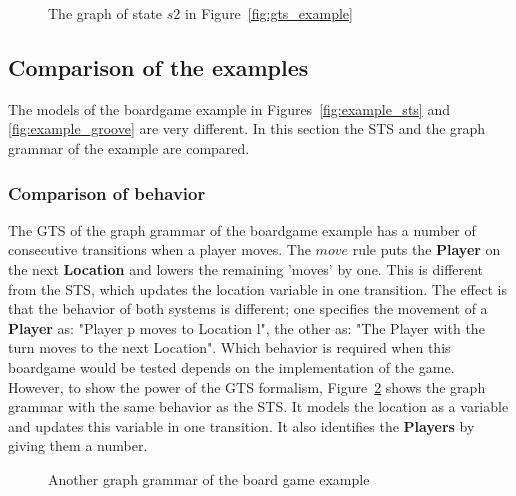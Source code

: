 \begin{figure}[ht]
  \begin{center}
    
  \end{center}
  \caption{The graph of state $s2$ in Figure~\ref{fig:gts_example}}
  \label{fig:target_graph_state}
\end{figure}

\subsection{Comparison of the examples}\label{sec:comparison}
The models of the boardgame example in Figures~\ref{fig:example_sts} and \ref{fig:example_groove} are very different. In this section the STS and the graph grammar of the example are compared.

\subsubsection{Comparison of behavior}
The GTS of the graph grammar of the boardgame example has a number of consecutive transitions when a player moves. The $move$ rule puts the \textbf{Player} on the next \textbf{Location} and lowers the remaining 'moves' by one. This is different from the STS, which updates the location variable in one transition. The effect is that the behavior of both systems is different; one specifies the movement of a \textbf{Player} as: "Player p moves to Location l", the other as: "The Player with the turn moves to the next Location". Which behavior is required when this boardgame would be tested depends on the implementation of the game. However, to show the power of the GTS formalism, Figure~\ref{fig:example_groove2} shows the graph grammar with the same behavior as the STS. It models the location as a variable and updates this variable in one transition. It also identifies the \textbf{Players} by giving them a number.

\begin{figure}[ht]
  \begin{center}
    \quad
  \end{center}
  \caption{Another graph grammar of the board game example}
  \label{fig:example_groove2}
\end{figure}

